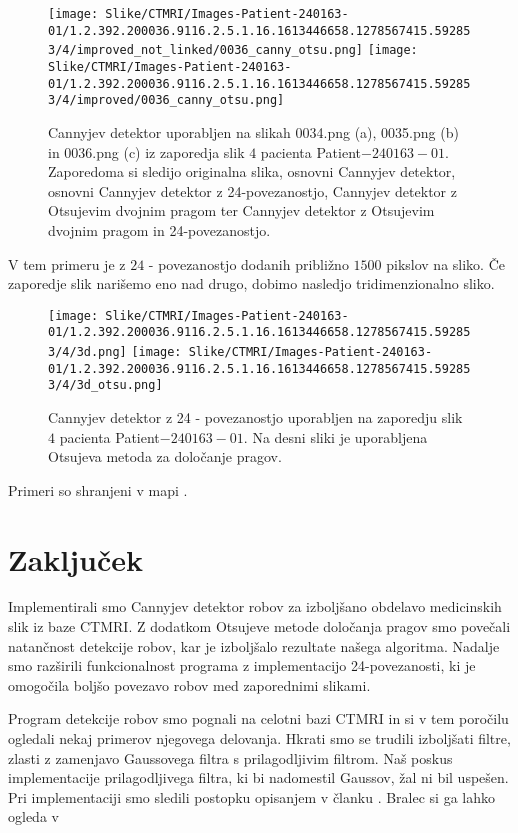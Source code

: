\documentclass{article}
\begin{document}
\begin{figure}[H]
        \texttt{[image: Slike/CTMRI/Images-Patient-240163-01/1.2.392.200036.9116.2.5.1.16.1613446658.1278567415.592853/4/improved\_not\_linked/0036\_canny\_otsu.png]} 
        \texttt{[image: Slike/CTMRI/Images-Patient-240163-01/1.2.392.200036.9116.2.5.1.16.1613446658.1278567415.592853/4/improved/0036\_canny\_otsu.png]} \\
        \caption{Cannyjev detektor uporabljen na slikah 0034.png (a), 0035.png (b) in 0036.png (c) iz zaporedja slik $4$ pacienta Patient$-240163-01$. 
        Zaporedoma si sledijo originalna slika, osnovni Cannyjev detektor, osnovni Cannyjev detektor z 24-povezanostjo, Cannyjev detektor z Otsujevim dvojnim pragom ter Cannyjev detektor z Otsujevim dvojnim pragom in 24-povezanostjo. }
        \label{ex1}
    \end{figure}

    V tem primeru je z $24$ - povezanostjo dodanih približno $1500$ pikslov na sliko.
    Če zaporedje slik narišemo eno nad drugo, dobimo nasledjo tridimenzionalno sliko.

    \begin{figure}[H]
        \centering
        \texttt{[image: Slike/CTMRI/Images-Patient-240163-01/1.2.392.200036.9116.2.5.1.16.1613446658.1278567415.592853/4/3d.png]}
        \texttt{[image: Slike/CTMRI/Images-Patient-240163-01/1.2.392.200036.9116.2.5.1.16.1613446658.1278567415.592853/4/3d\_otsu.png]} 
        \caption{Cannyjev detektor z 24 - povezanostjo uporabljen na zaporedju slik $4$ pacienta Patient$-240163-01$.  Na desni sliki je uporabljena Otsujeva metoda za določanje pragov.}
        \label{ex1}
    \end{figure}
    Primeri so shranjeni v mapi .


    \section{Zaključek}
    Implementirali smo Cannyjev detektor robov za izboljšano obdelavo medicinskih slik iz baze CTMRI. 
    Z dodatkom Otsujeve metode določanja pragov smo povečali natančnost detekcije robov, kar je izboljšalo 
    rezultate našega algoritma. Nadalje smo razširili funkcionalnost programa z implementacijo 24-povezanosti, 
    ki je omogočila boljšo povezavo robov med zaporednimi slikami.

    Program detekcije robov smo pognali na celotni bazi CTMRI in si v tem poročilu ogledali nekaj primerov njegovega delovanja.
    Hkrati smo se trudili izboljšati filtre, zlasti z zamenjavo Gaussovega filtra s prilagodljivim filtrom. Naš poskus 
    implementacije prilagodljivega filtra, ki bi nadomestil Gaussov, žal ni bil uspešen. Pri implementaciji smo sledili 
    postopku opisanjem v članku \cite{izboljsava}.
    Bralec si ga lahko ogleda v 
\end{document}
